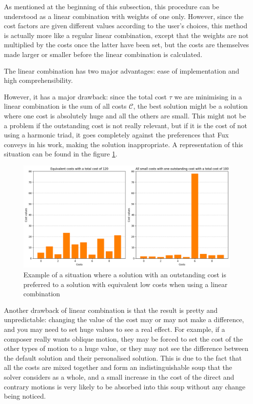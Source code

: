As mentioned at the beginning of this subsection, this procedure can be understood as a linear combination with weights of one only. However, since the cost factors are given different values according to the user's choices, this method is actually more like a regular linear combination, except that the weights are not multiplied by the costs once the latter have been set, but the costs are themselves made larger or smaller before the linear combination is calculated.

The linear combination has two major advantages: ease of implementation and high comprehensibility.


However, it has a major drawback: since the total cost $\tau$ we are minimising in a linear combination is the sum of all costs $\mathcal{C}$, the best solution might be a solution where one cost is absolutely huge and all the others are small. This might not be a problem if the outstanding cost is not really relevant, but if it is the cost of not using a harmonic triad, it goes completely against the preferences that Fux conveys in his work, making the solution inappropriate. A representation of this situation can be found in the figure \ref{fig:outstanding-cost}.

\begin{figure}[h]
    \centering
    \includegraphics[width=1\textwidth]{Images/outstanding-costs.png}
    \caption{Example of a situation where a solution with an outstanding cost is preferred to a solution with equivalent low costs when using a linear combination}
    \label{fig:outstanding-cost}
\end{figure}

Another drawback of linear combination is that the result is pretty and unpredictable: changing the value of the cost may or may not make a difference, and you may need to set huge values to see a real effect. For example, if a composer really wants oblique motion, they may be forced to set the cost of the other types of motion to a huge value, or they may not see the difference between the default solution and their personalised solution. This is due to the fact that all the costs are mixed together and form an indistinguishable soup that the solver considers as a whole, and a small increase in the cost of the direct and contrary motions is very likely to be absorbed into this soup without any change being noticed.


